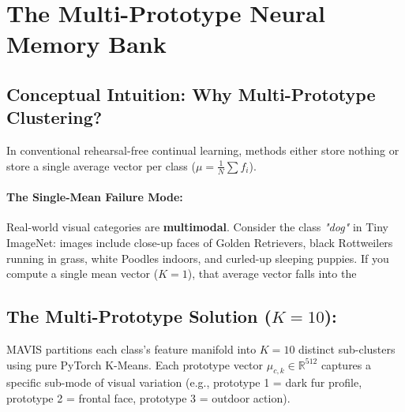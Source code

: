 \documentclass[11pt,a4paper]{article}
\begin{document}
\newpage

\section{The Multi-Prototype Neural Memory Bank}
\label{sec:memory-bank}

\subsection{Conceptual Intuition: Why Multi-Prototype Clustering?}
In conventional rehearsal-free continual learning, methods either store nothing or store a single average vector per class ($\mu = \frac{1}{N} \sum f_i$). 

\paragraph{The Single-Mean Failure Mode:}
Real-world visual categories are \textbf{multimodal}. Consider the class \textit{"dog"} in Tiny ImageNet: images include close-up faces of Golden Retrievers, black Rottweilers running in grass, white Poodles indoors, and curled-up sleeping puppies. If you compute a single mean vector ($K=1$), that average vector falls into the \subsection{The Multi-Prototype Solution ($K=10$):}
MAVIS partitions each class's feature manifold into $K = 10$ distinct sub-clusters using pure PyTorch K-Means. Each prototype vector $\mu_{c, k} \in \mathbb{R}^{512}$ captures a specific sub-mode of visual variation (e.g., prototype 1 = dark fur profile, prototype 2 = frontal face, prototype 3 = outdoor action).
\end{document}
